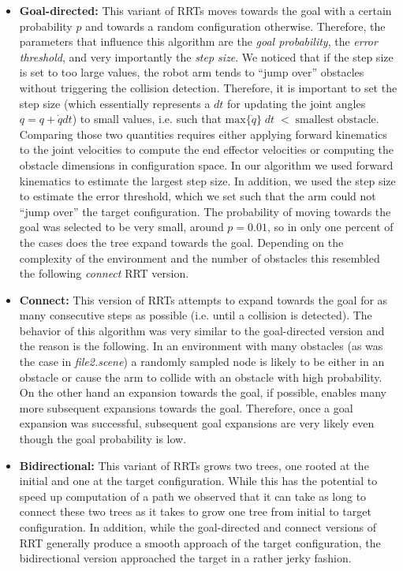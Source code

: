 \documentclass[12pt]{article}
\begin{document}
\begin{itemize}
 \item \textbf{Goal-directed:} This variant of RRTs moves towards the goal with a certain probability $p$ and towards a random configuration otherwise. Therefore, the parameters that influence this algorithm are the \textit{goal probability}, the \textit{error threshold}, and very importantly the \textit{step size}. We noticed that if the step size is set to too large values, the robot arm tends to ``jump over'' obstacles without triggering the collision detection. Therefore, it is important to set the step size (which essentially represents a $dt$ for updating the joint angles $q = q + \dot{q} dt$) to small values, i.e. such that $\mathrm{max}\{ \dot{q} \} \; dt \; < \; \mathrm{smallest} \; \mathrm{obstacle}$. Comparing those two quantities requires either applying forward kinematics to the joint velocities to compute the end effector velocities or computing the obstacle dimensions in configuration space. In our algorithm we used forward kinematics to estimate the largest step size. In addition, we used the step size to estimate the error threshold, which we set such that the arm could not ``jump over'' the target configuration. \newline
 The probability of moving towards the goal was selected to be very small, around $p = 0.01$, so in only one percent of the cases does the tree expand towards the goal. Depending on the complexity of the environment and the number of obstacles this resembled the following \textit{connect} RRT version. 
 
 \item \textbf{Connect:} This version of RRTs attempts to expand towards the goal for as many consecutive steps as possible (i.e. until a collision is detected). The behavior of this algorithm was very similar to the goal-directed version and the reason is the following. In an environment with many obstacles (as was the case in \textit{file2.scene}) a randomly sampled node is likely to be either in an obstacle or cause the arm to collide with an obstacle with high probability. On the other hand an expansion towards the goal, if possible, enables many more subsequent expansions towards the goal. Therefore, once a goal expansion was successful, subsequent goal expansions are very likely even though the goal probability is low. 
 
 \item \textbf{Bidirectional:} This variant of RRTs grows two trees, one rooted at the initial and one at the target configuration. While this has the potential to speed up computation of a path we observed that it can take as long to connect these two trees as it takes to grow one tree from initial to target configuration. In addition, while the goal-directed and connect versions of RRT generally produce a smooth approach of the target configuration, the bidirectional version approached the target in a rather jerky fashion. 
\end{itemize}
\end{document}
